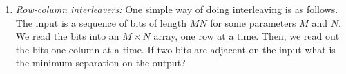 \documentclass[11pt]{article}
\begin{document}
\begin{enumerate}
\item \emph{Row-column interleavers:}  One simple way of doing interleaving is as follows.
The input is a sequence of bits of length $MN$ for some parameters $M$ and $N$.
We read the bits into an $M \times N$ array, one row at a time.  Then, we read out
the bits one column at a time.  If two bits are adjacent on the input what is the minimum separation on the output?
\end{enumerate}
\end{document}
